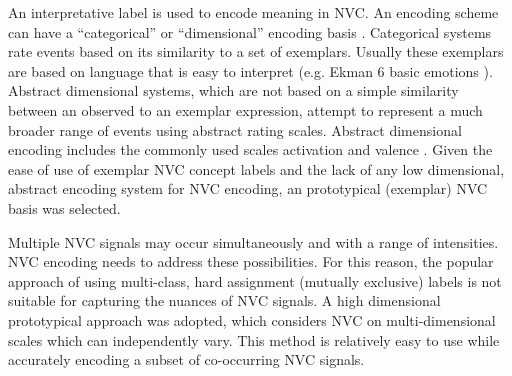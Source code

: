 An interpretative label is used to encode meaning in \ac{NVC}. An encoding scheme can have a ``categorical'' or ``dimensional'' encoding basis \cite{Cowie2005}. 
Categorical systems rate events based on its similarity to a set of exemplars. Usually these exemplars are based on language that is easy to interpret (e.g. Ekman 6 basic emotions \cite{Ekman1972}). Abstract dimensional systems, which are not based on a simple similarity between an observed to an exemplar expression, attempt to represent a much broader range of events using abstract rating scales. Abstract dimensional encoding includes the commonly used scales activation and valence \cite{Devillers2005}.
Given the ease of use of exemplar NVC concept labels and the lack of any low dimensional, abstract encoding system for \ac{NVC} encoding, an prototypical (exemplar) \ac{NVC} basis was selected.

Multiple \ac{NVC} signals may occur simultaneously and with a range of intensities. \ac{NVC} encoding needs to address these possibilities. 
For this reason, the popular approach of using multi-class, hard assignment (mutually exclusive) labels is not suitable for capturing the nuances of \ac{NVC} signals. A high dimensional prototypical approach was adopted, which considers \ac{NVC} on multi-dimensional scales \cite{Kruskal1978} which can independently vary. This method is relatively easy to use while accurately encoding a subset of co-occurring \ac{NVC} signals.

